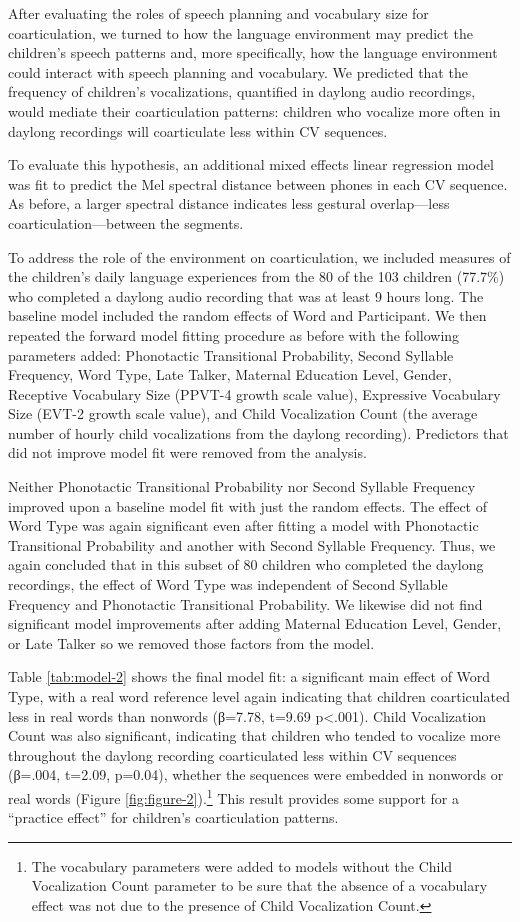 \documentclass[a4paper,man,natbib,donotrepeattitle, apacite]{apa6}
\begin{document}
After evaluating the roles of speech planning and vocabulary size for coarticulation, we turned to how the language environment may predict the children’s speech patterns and, more specifically, how the language environment could interact with speech planning and vocabulary. We predicted that the frequency of children’s vocalizations, quantified in daylong audio recordings, would mediate their coarticulation patterns: children who vocalize more often in daylong recordings will coarticulate less within CV sequences. 

To evaluate this hypothesis, an additional mixed effects linear regression model was fit to predict the Mel spectral distance between phones in each CV sequence. As before, a larger spectral distance indicates less gestural overlap---less coarticulation---between the segments.

To address the role of the environment on coarticulation, we included measures of the children’s daily language experiences from the 80 of the 103 children (77.7\%) who completed a daylong audio recording that was at least 9 hours long. The baseline model included the random effects of Word and Participant. We then repeated the forward model fitting procedure as before with the following parameters added: Phonotactic Transitional Probability, Second Syllable Frequency, Word Type, Late Talker, Maternal Education Level, Gender, Receptive Vocabulary Size (PPVT-4 growth scale value), Expressive Vocabulary Size (EVT-2 growth scale value), and Child Vocalization Count (the average number of hourly child vocalizations from the daylong recording). Predictors that did not improve model fit were removed from the analysis. 

Neither Phonotactic Transitional Probability nor Second Syllable Frequency improved upon a baseline model fit with just the random effects. The effect of Word Type was again significant even after fitting a model with Phonotactic Transitional Probability and another with Second Syllable Frequency. Thus, we again concluded that in this subset of 80 children who completed the daylong recordings, the effect of Word Type was independent of Second Syllable Frequency and Phonotactic Transitional Probability. We likewise did not find significant model improvements after adding Maternal Education Level, Gender, or Late Talker so we removed those factors from the model. 

Table \ref{tab:model-2} shows the final model fit: a significant main effect of Word Type, with a real word reference level again indicating that children coarticulated less in real words than nonwords (β=7.78, t=9.69 p<.001). Child Vocalization Count was also significant, indicating that children who tended to vocalize more throughout the daylong recording coarticulated less within CV sequences (β=.004, t=2.09, p=0.04), whether the sequences were embedded in nonwords or real words (Figure \ref{fig:figure-2}).\footnote{The vocabulary parameters were added to models without the Child Vocalization Count parameter to be sure that the absence of a vocabulary effect was not due to the presence of Child Vocalization Count.} This result provides some support for a ``practice effect'' for children’s coarticulation patterns.
\end{document}
